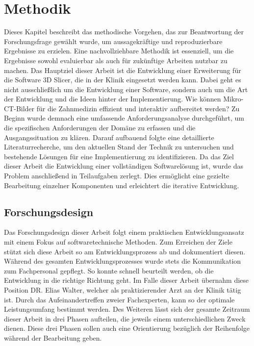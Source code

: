 \chapter{Methodik}
\label{chap:methodik} Dieses Kapitel beschreibt das methodische Vorgehen, das
zur Beantwortung der Forschungsfrage gewählt wurde, um aussagekräftige und reproduzierbare
Ergebnisse zu erzielen. Eine nachvollziehbare Methodik ist essenziell, um die Ergebnisse
sowohl evaluierbar als auch für zukünftige Arbeiten nutzbar zu machen. Das
Hauptziel dieser Arbeit ist die Entwicklung einer Erweiterung für die Software
3D Slicer, die in der Klinik eingesetzt werden kann. Dabei geht es nicht
ausschließlich um die Entwicklung einer Software, sondern auch um die Art der Entwicklung
und die Ideen hinter der Implementierung. Wie können Mikro-\ac{CT}-Bilder für die
Zahnmedizin effizient und interaktiv aufbereitet werden? Zu Beginn wurde demnach
eine umfassende Anforderungsanalyse durchgeführt, um die spezifischen Anforderungen
der Domäne zu erfassen und die Ausgangssituation zu klären. Darauf aufbauend
folgte eine detaillierte Literaturrecherche, um den aktuellen Stand der Technik zu
untersuchen und bestehende Lösungen für eine Implementierung zu identifizieren.
Da das Ziel dieser Arbeit die Entwicklung einer vollständigen Softwarelösung ist,
wurde das Problem anschließend in Teilaufgaben zerlegt. Dies ermöglicht eine
gezielte Bearbeitung einzelner Komponenten und erleichtert die iterative
Entwicklung.

\section{Forschungsdesign}
Das Forschungsdesign dieser Arbeit folgt einem praktischen Entwicklungsansatz
mit einem Fokus auf softwaretechnische Methoden. Zum Erreichen der Ziele stützt sich
diese Arbeit so am Entwicklungsprozess ab und dokumentiert diesen. Während des
gesamten Entwicklungsprozesses wurde stets die Kommunikation zum Fachpersonal
gepflegt. So konnte schnell beurteilt werden, ob die Entwicklung in die richtige
Richtung geht. Im Falle dieser Arbeit übernahm diese Position DR. Elias Walter, welcher
als praktizierender Arzt an der Klinik tätig ist. Durch das Aufeinandertreffen
zweier Fachexperten, kann so der optimale Leistungsumfang bestimmt werden. Des
Weiteren lässt sich der gesamte Zeitraum dieser Arbeit in drei Phasen aufteilen,
die jeweils einem unterschiedlichen Zweck dienen. Diese drei Phasen sollen auch
eine Orientierung bezüglich der Reihenfolge während der Bearbeitung geben.
\pagebreak

